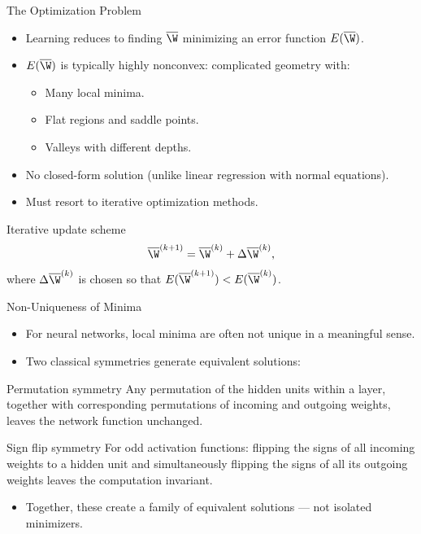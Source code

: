 \begin{frame}{The Optimization Problem}
  \begin{itemize}
    \item Learning reduces to finding $\overline{\W}$ minimizing an \alert{error function} $E(\overline{\W})$.
    \item $E(\overline{\W})$ is typically \alert{highly nonconvex}: complicated geometry with:
      \begin{itemize}
        \item Many local minima.
        \item Flat regions and saddle points.
        \item Valleys with different depths.
      \end{itemize}
    \item No closed-form solution (unlike linear regression with normal equations).
    \item Must resort to \alert{iterative optimization methods}.
  \end{itemize}
  \begin{block}{Iterative update scheme}
    \[
      \overline{\W}^{(k+1)} = \overline{\W}^{(k)} + \Delta\overline{\W}^{(k)},
    \]
    where $\Delta\overline{\W}^{(k)}$ is chosen so that $E(\overline{\W}^{(k+1)}) < E(\overline{\W}^{(k)})$.
  \end{block}
\end{frame}

\begin{frame}{Non-Uniqueness of Minima}
  \begin{itemize}
    \item For neural networks, local minima are often \alert{not unique} in a meaningful sense.
    \item Two classical symmetries generate equivalent solutions:
  \end{itemize}
  \begin{block}{Permutation symmetry}
    Any permutation of the hidden units within a layer, together with corresponding permutations of
    incoming and outgoing weights, leaves the network function \alert{unchanged}.
  \end{block}
  \begin{block}{Sign flip symmetry}
    For odd activation functions: flipping the signs of all incoming weights to a hidden unit and
    simultaneously flipping the signs of all its outgoing weights leaves the computation \alert{invariant}.
  \end{block}
  \begin{itemize}
    \item Together, these create a \alert{family of equivalent solutions} — not isolated minimizers.
  \end{itemize}
\end{frame}

